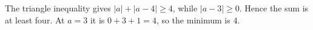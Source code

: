 The triangle inequality gives $|a|+|a-4|\ge4$, while $|a-3|\ge0$. Hence the sum is at least four. At $a=3$ it is $0+3+1=4$, so the minimum is $\boxed4$.
